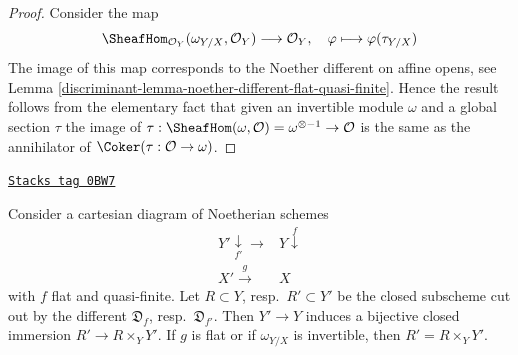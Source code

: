 \begin{proof}

Consider the map
$$
\SheafHom_{\mathcal{O}_Y}(\omega_{Y/X}, \mathcal{O}_Y)
\longrightarrow
\mathcal{O}_Y,\quad
\varphi \longmapsto \varphi(\tau_{Y/X})
$$
The image of this map corresponds to the Noether different
on affine opens, see Lemma \ref{discriminant-lemma-noether-different-flat-quasi-finite}.
Hence the result follows from the elementary fact that given
an invertible module $\omega$ and a global section $\tau$
the image of
$\tau : \SheafHom(\omega, \mathcal{O}) = \omega^{\otimes -1} \to \mathcal{O}$
is the same as the annihilator of $\Coker(\tau : \mathcal{O} \to \omega)$.
\end{proof}

\begin{lemma}
\label{discriminant-lemma-base-change-different}
\href{https://stacks.math.columbia.edu/tag/0BW7}{\texttt{Stacks tag 0BW7}}

Consider a cartesian diagram of Noetherian schemes
$$
\begin{array}{cc}Y' \underset{f'}{\downarrow}\longrightarrow & Y \overset{f}{\downarrow} \\ X' \overset{g}{\longrightarrow} & X\end{array}
$$
with $f$ flat and quasi-finite. Let $R \subset Y$, resp.\ $R' \subset Y'$
be the closed subscheme cut out by the different
$\mathfrak{D}_f$, resp.\ $\mathfrak{D}_{f'}$.
Then $Y' \to Y$ induces a bijective closed immersion $R' \to R \times_Y Y'$.
If $g$ is flat or if $\omega_{Y/X}$ is invertible, then
$R' = R \times_Y Y'$.
\end{lemma}


